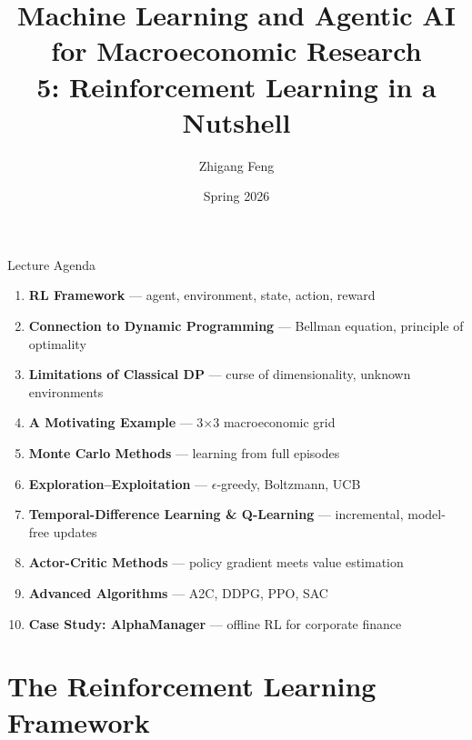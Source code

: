 \documentclass[10pt,english,aspectratio=169]{beamer}
\title[ML \& Agentic AI for Macro Research]{Machine Learning and Agentic AI for Macroeconomic Research\\
5: Reinforcement Learning in a Nutshell\\[0.5em]}
\author{Zhigang Feng}
\date{Spring 2026}
\newcommand\makebeamertitle{\frame{\maketitle}}%
\begin{document}
\makebeamertitle


\begin{frame}{Lecture Agenda}
\begin{enumerate}
  \item \textbf{RL Framework} --- agent, environment, state, action, reward
  \medskip
  \item \textbf{Connection to Dynamic Programming} --- Bellman equation, principle of optimality
  \medskip
  \item \textbf{Limitations of Classical DP} --- curse of dimensionality, unknown environments
  \medskip
  \item \textbf{A Motivating Example} --- 3$\times$3 macroeconomic grid
  \medskip
  \item \textbf{Monte Carlo Methods} --- learning from full episodes
  \medskip
  \item \textbf{Exploration--Exploitation} --- $\epsilon$-greedy, Boltzmann, UCB
  \medskip
  \item \textbf{Temporal-Difference Learning \& Q-Learning} --- incremental, model-free updates
  \medskip
  \item \textbf{Actor-Critic Methods} --- policy gradient meets value estimation
  \medskip
  \item \textbf{Advanced Algorithms} --- A2C, DDPG, PPO, SAC
  \medskip
  \item \textbf{Case Study: AlphaManager} --- offline RL for corporate finance
\end{enumerate}
\end{frame}

\section{The Reinforcement Learning Framework}
\end{document}
